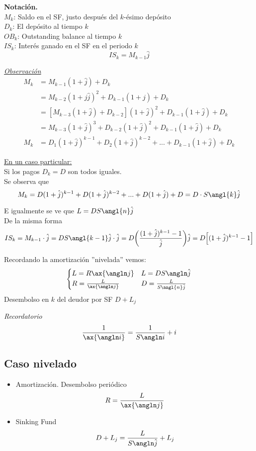 \textbf{Notación.}\\
$M_k$: Saldo en el SF, justo después del $k$-ésimo depósito\\
$D_k$: El depósito al tiempo $k$\\
$OB_k$: Outstanding balance al tiempo $k$\\
$IS_k$: Interés ganado en el SF en el periodo $k$
$$IS_k=M_{k-1}\hat{j}$$

\underline{\textit{Observación}}\\
\begin{align*}
    M_k &= M_{k-1}(1+\hat{j}) + D_k\\
    &= M_{k-2}(1+j\hat{j})^2 + D_{k-1}(1+\hat{j}) + D_k\\
    &= [M_{k-3}(1+\hat{j}) + D_{k-2}](1+\hat{j})^2 + D_{k-1}(1+\hat{j}) + D_k \\
    &= M_{k-3}(1+\hat{j})^3 + D_{k-2}(1+\hat{j})^2 + D_{k-1}(1+\hat{j}) + D_k\\
    M_k &= D_1(1+\hat{j})^{k-1} + D_2 (1+\hat{j})^{k-2} + ... + D_{k-1} (1+\hat{j}) + D_k
\end{align*}

\underline{En un caso particular:}\\
Si los pagos $D_k=D$ son todos iguales.\\

 Se observa que 
$$M_k = D(1+\hat{j})^{k-1} + D(1+\hat{j})^{k-2} + ... + D(1+\hat{j}) + D = D\cdot S\angl{k}\hat{j} $$

 E igualmente se ve que $L=DS\angl{n}\hat{j}$\\

 De la misma forma
$$IS_k = M_{k-1}\cdot \hat{j} = DS\angl{k-1}\hat{j}\cdot\hat{j} = D\bigg( \frac{(1+\hat{j})^{k-1} -1}{\hat{j}}\bigg)\hat{j} = D\Big[(1+\hat{j})^{k-1} -1\Big]$$

 Recordando la amortización ''nivelada'' vemos:\\
\begin{align*}
    \begin{cases}
    L=R\ax{\angln j} & L=DS\angln\hat{j}\\
    R=\frac{L}{\ax{\angln j}} & D= \frac{L}{S\angl{n}\hat{j}}
    \end{cases}
\end{align*}
Desembolso en $k$ del deudor por SF $D+L_j$

\textit{Recordatorio}
$$\frac{1}{\ax{\angln i}} = \frac{1}{S\angln i} + i$$

\subsection*{Caso nivelado}
\begin{itemize}
    \item Amortización. Desembolso periódico
    $$R=\frac{L}{\ax{\angln j}}$$
    \item Sinking Fund
    $$D + L_j = \frac{L}{S\angln\hat{j}} + L_j$$
\end{itemize}

